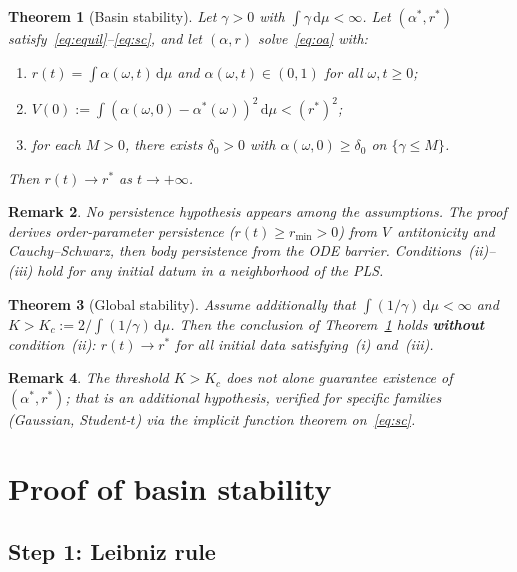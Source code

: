 \documentclass[11pt,a4paper]{article}
\newtheorem{theorem}{Theorem}[section]
\newtheorem{remark}[theorem]{Remark}
\theoremstyle{definition}
\begin{document}
\begin{theorem}[Basin stability]\label{thm:main}
Let $\gamma>0$ with $\int\gamma\,\mathrm{d}\mu<\infty$. Let $(\alpha^*,r^*)$ satisfy~\eqref{eq:equil}--\eqref{eq:sc}, and let $(\alpha,r)$ solve~\eqref{eq:oa} with:
\begin{enumerate}[label=(\roman*)]
\item $r(t) = \int\alpha(\omega,t)\,\mathrm{d}\mu$ and $\alpha(\omega,t)\in(0,1)$ for all $\omega,t\geq 0$;
\item $V(0) := \int(\alpha(\omega,0)-\alpha^*(\omega))^2\,\mathrm{d}\mu < (r^*)^2$;
\item for each $M>0$, there exists $\delta_0>0$ with $\alpha(\omega,0)\geq\delta_0$ on $\{\gamma\leq M\}$.
\end{enumerate}
Then $r(t)\to r^*$ as $t\to+\infty$.
\end{theorem}

\begin{remark}
No persistence hypothesis appears among the assumptions. The proof \emph{derives} order-parameter persistence ($r(t)\geq r_{\min}>0$) from $V$~antitonicity and Cauchy--Schwarz, then body persistence from the ODE barrier. Conditions~(ii)--(iii) hold for any initial datum in a neighborhood of the PLS.
\end{remark}

\begin{theorem}[Global stability]\label{thm:global}
Assume additionally that $\int(1/\gamma)\,\mathrm{d}\mu<\infty$ and $K > K_c := 2/\!\int\!(1/\gamma)\,\mathrm{d}\mu$. Then the conclusion of Theorem~\ref{thm:main} holds \textbf{without} condition~(ii): $r(t)\to r^*$ for all initial data satisfying~(i) and~(iii).
\end{theorem}

\begin{remark}
The threshold $K>K_c$ does not alone guarantee existence of $(\alpha^*,r^*)$; that is an additional hypothesis, verified for specific families (Gaussian, Student-$t$) via the implicit function theorem on~\eqref{eq:sc}.
\end{remark}

\section{Proof of basin stability}\label{sec:proof}

\subsection{Step 1: Leibniz rule}\label{sec:leibniz}
\end{document}

